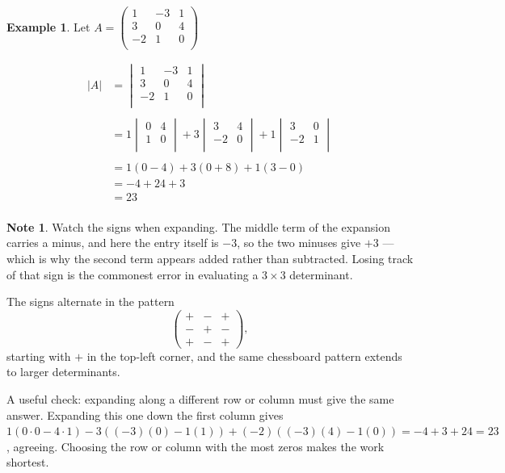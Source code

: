 \documentclass[11pt,a4paper]{article}
\theoremstyle{definition}
\newtheorem{example}[thm]{Example}
\newtheorem{note}[thm]{Note}
\begin{document}
\begin{example}

Let $A=
\begin{pmatrix}
1 & -3 & 1\\
3 & 0 & 4\\
-2 & 1 & 0\\
\end{pmatrix}
$

\begin{align*}
|A| & =
\begin{vmatrix}
1 & -3 & 1\\
3 & 0 & 4\\
-2 & 1 & 0\\
\end{vmatrix}\\\\
& = 1
\begin{vmatrix}
0 & 4\\
1 & 0\\
\end{vmatrix}
+3
\begin{vmatrix}
3 & 4\\
-2 & 0\\
\end{vmatrix}
+1
\begin{vmatrix}
3 & 0\\
-2 & 1\\
\end{vmatrix}\\\\
& = 1 (0-4)+3(0+8)+1(3-0)\\
& = -4+24+3\\
& = 23\\
\end{align*}
\end{example}

\begin{note}
Watch the signs when expanding. The middle term of the expansion carries a minus,
and here the entry itself is $-3$, so the two minuses give $+3$ --- which is why the
second term appears added rather than subtracted. Losing track of that sign is the
commonest error in evaluating a $3\times 3$ determinant.

The signs alternate in the pattern
$$\begin{pmatrix}+&-&+\\-&+&-\\+&-&+\end{pmatrix},$$
starting with $+$ in the top-left corner, and the same chessboard pattern extends
to larger determinants.

A useful check: expanding along a different row or column must give the same
answer. Expanding this one down the first column gives
$1(0\cdot 0-4\cdot 1)-3\left((-3)(0)-1(1)\right)+(-2)\left((-3)(4)-1(0)\right)
=-4+3+24=23$, agreeing. Choosing the row or column with the most zeros makes the
work shortest.
\end{note}
\end{document}
